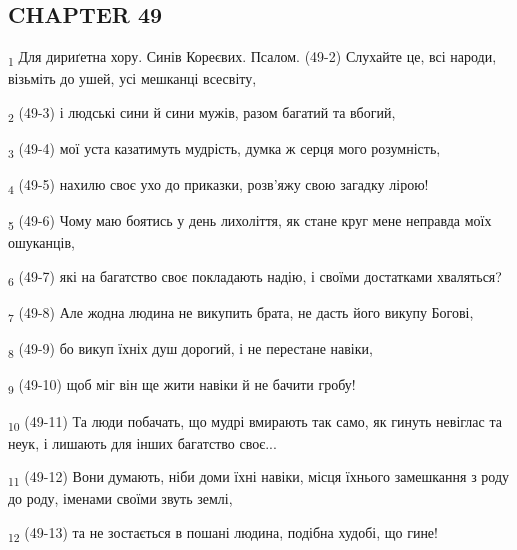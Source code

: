 \subsection{CHAPTER 49}
\begin{tcolorbox}
\textsubscript{1} Для дириґетна хору. Синів Кореєвих. Псалом. (49-2) Слухайте це, всі народи, візьміть до ушей, усі мешканці всесвіту,
\end{tcolorbox}
\begin{tcolorbox}
\textsubscript{2} (49-3) і людські сини й сини мужів, разом багатий та вбогий,
\end{tcolorbox}
\begin{tcolorbox}
\textsubscript{3} (49-4) мої уста казатимуть мудрість, думка ж серця мого розумність,
\end{tcolorbox}
\begin{tcolorbox}
\textsubscript{4} (49-5) нахилю своє ухо до приказки, розв'яжу свою загадку лірою!
\end{tcolorbox}
\begin{tcolorbox}
\textsubscript{5} (49-6) Чому маю боятись у день лихоліття, як стане круг мене неправда моїх ошуканців,
\end{tcolorbox}
\begin{tcolorbox}
\textsubscript{6} (49-7) які на багатство своє покладають надію, і своїми достатками хваляться?
\end{tcolorbox}
\begin{tcolorbox}
\textsubscript{7} (49-8) Але жодна людина не викупить брата, не дасть його викупу Богові,
\end{tcolorbox}
\begin{tcolorbox}
\textsubscript{8} (49-9) бо викуп їхніх душ дорогий, і не перестане навіки,
\end{tcolorbox}
\begin{tcolorbox}
\textsubscript{9} (49-10) щоб міг він ще жити навіки й не бачити гробу!
\end{tcolorbox}
\begin{tcolorbox}
\textsubscript{10} (49-11) Та люди побачать, що мудрі вмирають так само, як гинуть невіглас та неук, і лишають для інших багатство своє...
\end{tcolorbox}
\begin{tcolorbox}
\textsubscript{11} (49-12) Вони думають, ніби доми їхні навіки, місця їхнього замешкання з роду до роду, іменами своїми звуть землі,
\end{tcolorbox}
\begin{tcolorbox}
\textsubscript{12} (49-13) та не зостається в пошані людина, подібна худобі, що гине!
\end{tcolorbox}
